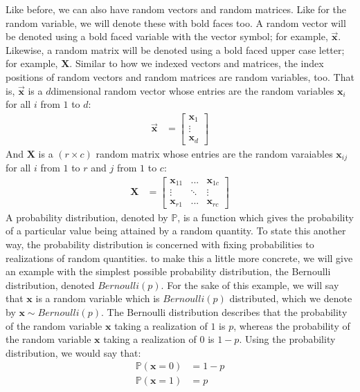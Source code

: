 \documentclass[letterpaper,10pt,english]{jupyterBook}
\begin{document}
\sphinxAtStartPar
Like before, we can also have random vectors and random matrices. Like for the random variable, we will denote these with bold faces too. A random vector will be denoted using a bold faced variable with the vector symbol; for example, \(\vec{\mathbf x}\). Likewise, a random matrix will be denoted using a bold faced upper case letter; for example, \(\mathbf X\). Similar to how we indexed vectors and matrices, the index positions of random vectors and random matrices are random variables, too. That is, \(\vec{\mathbf x}\) is a \(d\)\sphinxhyphen{}dimensional random vector whose entries are the random variables \(\mathbf x_i\) for all \(i\) from \(1\) to \(d\):
\begin{align*}
    \vec{\mathbf x} &= \begin{bmatrix}
        \mathbf x_1 \\
        \vdots \\
        \mathbf x_d
    \end{bmatrix}
\end{align*}
\sphinxAtStartPar
And \(\mathbf X\) is a \((r \times c)\) random matrix whose entries are the random varaiables \(\mathbf x_{ij}\) for all \(i\) from \(1\) to \(r\) and \(j\) from \(1\) to \(c\):
\begin{align*}
    \mathbf X &= \begin{bmatrix}
        \mathbf x_{11} & ... & \mathbf x_{1c} \\
        \vdots & \ddots & \vdots \\
        \mathbf x_{r1} & ... & \mathbf x_{rc}
    \end{bmatrix}
\end{align*}
\sphinxAtStartPar
A probability distribution, denoted by \(\mathbb P\), is a function which gives the probability of a particular value being attained by a random quantity. To state this another way, the probability distribution is concerned with fixing probabilities to realizations of random quantities. to make this a little more concrete, we will give an example with the simplest possible probability distribution, the Bernoulli distribution, denoted \(Bernoulli(p)\). For the sake of this example, we will say that \(\mathbf x\) is a random variable which is \(Bernoulli(p)\) distributed, which we denote by \(\mathbf x \sim Bernoulli(p)\). The Bernoulli distribution describes that the probability of the random variable \(\mathbf x\) taking a realization of \(1\) is \(p\), whereas the probability of the random variable \(\mathbf x\) taking a realization of \(0\) is \(1 - p\). Using the probability distribution, we would say that:
\begin{align*}
    \mathbb P(\mathbf x = 0) &= 1 - p \\
    \mathbb P(\mathbf x = 1) &= p
\end{align*}
\end{document}
